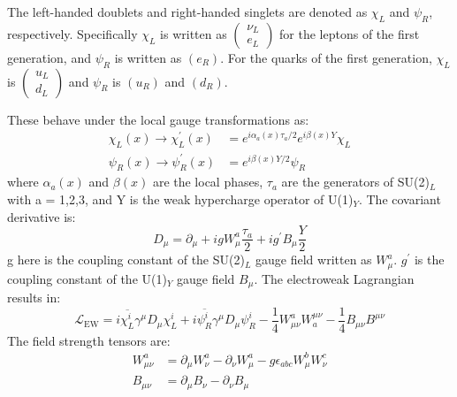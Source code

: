 The left-handed doublets and right-handed singlets are denoted as $\chi_{L}$ and $\psi_{R}$, respectively. Specifically $\chi_{L}$ is written as 
$
\left(\begin{array}{c}
\nu_{L} \\
e_{L}
\end{array}\right)
$
for the leptons of the first generation, and $\psi_{R}$ is written as $(e_R)$.
For the quarks of the first generation, $\chi_{L}$ is 
$
\left(\begin{array}{c}
u_{L} \\
d_{L}
\end{array}\right)
$
and $\psi_{R}$ is $(u_R)$ and $(d_R)$.




These behave under the local gauge transformations as:
\begin{equation}
\begin{aligned}
\chi_{L}(x) \rightarrow \chi_{L}^{\prime}(x) &=e^{i \alpha_{a}(x) \tau_{a}/2} e^{i \beta(x) Y} \chi_{L} \\
\psi_{R}(x) \rightarrow \psi_{R}^{\prime}(x) &=e^{i \beta(x) Y/2} \psi_{R}
\end{aligned}
\end{equation}
where $\alpha_{a}(x)$ and $\beta(x)$ are the local phases, $\tau_{a}$ are the generators of SU(2)$_L$ with a = 1,2,3, and Y is the weak hypercharge operator of U(1)$_Y$. The covariant derivative is:
\begin{equation}
D_{\mu}=\partial_{\mu}+i g W_{\mu}^{a} \frac{\tau_{a}}{2}+i g^{\prime} B_{\mu} \frac{Y}{2}
\end{equation}
g here is the coupling constant of the SU(2)$_L$ gauge field written as $W_{\mu}^{a}$. $g^{\prime}$ is the coupling constant of the U(1)$_Y$ gauge field $B_{\mu}$.
The electroweak Lagrangian results in:
\begin{equation}
\mathcal{L}_{\mathrm{EW}}=i \overline{\chi_{L}^{i}} \gamma^{\mu} D_{\mu} \chi_{L}^{i}+i \overline{\psi_{R}^{i}} \gamma^{\mu} D_{\mu} \psi_{R}^{i}-\frac{1}{4} W_{\mu \nu}^{a} W_{a}^{\mu \nu}-\frac{1}{4} B_{\mu \nu} B^{\mu \nu}
\end{equation}
The field strength tensors are:
\begin{equation}
\begin{aligned}
W_{\mu \nu}^{a} &=\partial_{\mu} W_{\nu}^{a}-\partial_{\nu} W_{\mu}^{a}-g \epsilon_{a b c} W_{\mu}^{b} W_{\nu}^{c} \\
B_{\mu \nu} &=\partial_{\mu} B_{\nu}-\partial_{\nu} B_{\mu}
\end{aligned}
\end{equation}
